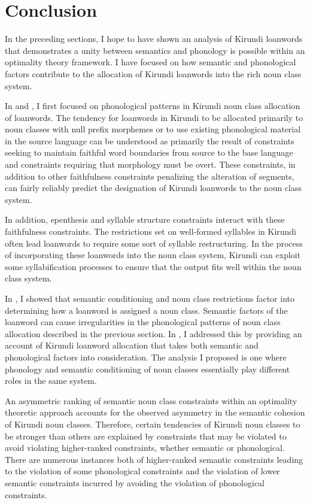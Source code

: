 \documentclass[output=paper,colorlinks,citecolor=brown,
]{langscibook}
\begin{document}
\section{Conclusion}
\label{sec:kinchsular:conclusion}

In the preceding sections, I hope to have shown an analysis of Kirundi loanwords that demonstrates a unity between semantics and phonology is possible within an optimality theory framework. I have focused on how semantic and phonological factors contribute to the allocation of Kirundi loanwords into the rich noun class system. 

In  and , I first focused on phonological patterns in Kirundi noun class allocation of loanwords. The tendency for loanwords in Kirundi to be allocated primarily to noun classes with null prefix morphemes or to use existing phonological material in the source language can be understood as primarily the result of constraints seeking to maintain faithful word boundaries from source to the base language and constraints requiring that morphology must be overt. These constraints, in addition to other faithfulness constraints penalizing the alteration of segments, can fairly reliably predict the designation of Kirundi loanwords to the noun class system. 

In addition, epenthesis and syllable structure constraints interact with these faithfulness constraints. The restrictions set on well-formed syllables in Kirundi often lead loanwords to require some sort of syllable restructuring. In the process of incorporating these loanwords into the noun class system, Kirundi can exploit some syllabification processes to ensure that the output fits well within the noun class system. 

In , I showed that semantic conditioning and noun class restrictions factor into determining how a loanword is assigned a noun class. Semantic factors of the loanword can cause irregularities in the phonological patterns of noun class allocation described in the previous section. In , I addressed this by providing an account of Kirundi loanword allocation that takes both semantic and phonological factors into consideration. The analysis I proposed is one where phonology and semantic conditioning of noun classes essentially play different roles in the same system. 

An asymmetric ranking of semantic noun class constraints within an optimality theoretic approach accounts for the observed asymmetry in the semantic cohesion of Kirundi noun classes. Therefore, certain tendencies of Kirundi noun classes to be stronger than others are explained by constraints that may be violated to avoid violating higher-ranked constraints, whether semantic or phonological. There are numerous instances both of higher-ranked semantic constraints leading to the violation of some phonological constraints and the violation of lower semantic constraints incurred by avoiding the violation of phonological constraints. 
\end{document}
